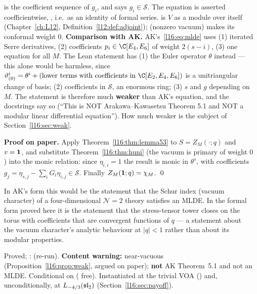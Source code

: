 \begin{dictionary}
 is the coefficient sequence of $g_i$, and  says
$g_i\in\mathcal S$. The equation is asserted coefficientwise, , i.e.\ as an identity of formal
series.  is $V$ as a module over itself (Chapter~\ref{ch:L12},
Definition~\ref{l12:def:adjoint});  (nonzero vacuum) makes its conformal weight $0$. \textbf{Comparison with
AK.} AK's~\eqref{l16:eq:mlde} uses (1) iterated Serre derivatives, (2) coefficients $p_i\in\C[E_4,E_6]$ of weight
$2(s-i)$, (3) one equation for all $M$. The Lean statement has (1) the Euler operator $\theta$ instead --- this alone
would be harmless, since $\vartheta^i_{(0)} = \theta^i + (\text{lower terms with coefficients in }\C[E_2,E_4,E_6])$ is a
unitriangular change of basis; (2) coefficients in $\mathcal S$, an enormous ring; (3) $s$ and $g$ depending on $M$. The
statement is therefore much \textbf{weaker} than AK's equation, and the docstrings say so (``This is NOT
Arakawa--Kawasetsu Theorem 5.1 and NOT a modular linear differential equation''). How much weaker is the subject of
Section~\ref{l16:sec:weak}.
\end{dictionary}

\textbf{Proof on paper.} Apply Theorem~\ref{l16:thm:lemma53} to $S = Z_M(\cdot;q)$ and $v=\mathbf{1}$, and substitute
Theorem~\ref{l16:thm:huni} (the vacuum is primary of weight $0$) into the monic relation: since $\eta_{i,i}=1$ the result is
monic in $\theta^s$, with coefficients $g_j = \eta_{s,j} - \sum_iG_i\eta_{i,j}\in\mathcal S$. Finally
$Z_M(\mathbf{1};q) = \chi_M$. \qed

\begin{physics}
In AK's form this would be the statement that the Schur index (vacuum character) of a four-dimensional $\mathcal N=2$
theory satisfies an MLDE. In the formal form proved here it is the statement that the stress-tensor tower closes on
the torus with coefficients that are convergent functions of $q$ --- a statement about the vacuum character's
analytic behaviour at $|q|<1$ rather than about its modular properties.
\end{physics}

\begin{status}
Proved; \allowbreak{}\allowbreak{}: \lean{[propext, Classical.}\allowbreak{}\allowbreak\lean{sound]} (re-run).
\textbf{Content warning:} near-vacuous (Proposition~\ref{l16:prop:weak}, argued on paper); \textbf{not} AK Theorem~5.1
and not an MLDE.
Conditional on  ( free). Instantiated at the trivial VOA (\allowbreak{}\allowbreak{})
and, unconditionally, at $L_{-4/3}(\mathfrak{sl}_2)$ (Section~\ref{l16:sec:payoff}).
\end{status}

